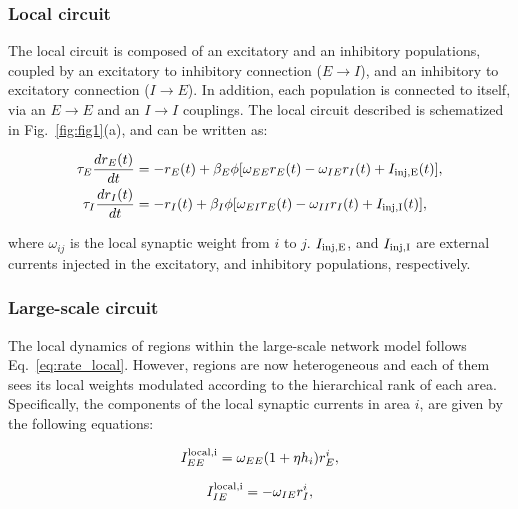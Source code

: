 \subsubsection{Local circuit}\label{local_rate}

The local circuit is composed of an excitatory and an inhibitory populations, coupled by an excitatory to inhibitory connection ($E\rightarrow I$), and an inhibitory to excitatory connection ($I\rightarrow E$). In addition, each population is connected to itself, via an $E\rightarrow E$ and an $I\rightarrow I$ couplings. The local circuit described is schematized in Fig.~\ref{fig:fig1}(a), and can be written as:

\begin{equation}
    \begin{split}
            \tau_{E}\frac{dr_{E}(t)}{dt} &= -r_{E}(t) + \beta_{E}\phi[\omega_{EE}r_{E}(t) - \omega_{IE}r_{I}(t) + I_{\rm inj, E}(t)],\\
            \tau_{I}\frac{dr_{I}(t)}{dt} &= -r_{I}(t) + \beta_{I}\phi[\omega_{EI}r_{E}(t) - \omega_{II}r_{I}(t) + I_{\rm inj, I}(t)],
    \end{split}
    \label{eq:rate_local}
\end{equation}

\noindent where $\omega_{ij}$ is the local synaptic weight from $i$ to $j$. $I_{\rm inj, E}$, and $I_{\rm inj, I}$ are external currents injected in the excitatory, and inhibitory populations, respectively.

\subsubsection{Large-scale circuit}\label{lr_rate} The local dynamics of regions within the large-scale network model follows Eq.~\ref{eq:rate_local}. However, regions are now heterogeneous and each of them sees its local weights modulated according to the hierarchical rank of each area. Specifically, the components of the local synaptic currents in area $i$, are given by the following equations:

\begin{equation}
        I^{\rm local,i}_{EE} = \omega_{EE}(1+\eta h_{i})r_E^{i},
        \label{eq:local_ee}
\end{equation}

\begin{equation}
        I^{\rm local,i}_{IE} = -\omega_{IE}r_I^{i}
        \label{eq:local_ie},
\end{equation}

